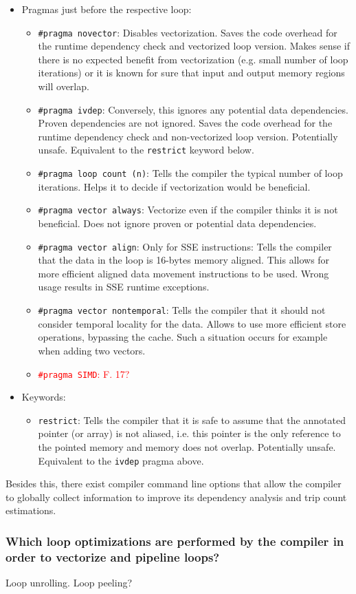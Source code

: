 \documentclass[11pt]{article}
\begin{document}
\begin{itemize}
\item Pragmas just before the respective loop:
\begin{itemize}
\item \texttt{\#pragma novector}: Disables vectorization. Saves the code overhead for the runtime dependency check and vectorized loop version. Makes sense if there is no expected benefit from vectorization (e.g. small number of loop iterations) or it is known for sure that input and output memory regions will overlap.
\item \texttt{\#pragma ivdep}: Conversely, this ignores any potential data dependencies. Proven dependencies are not ignored. Saves the code overhead for the runtime dependency check and non-vectorized loop version. Potentially unsafe. Equivalent to the \texttt{restrict} keyword below.
\item \texttt{\#pragma loop count (n)}: Tells the compiler the typical number of loop iterations. Helps it to decide if vectorization would be beneficial.
\item \texttt{\#pragma vector always}: Vectorize even if the compiler thinks it is not beneficial. Does not ignore proven or potential data dependencies.
\item \texttt{\#pragma vector align}: Only for SSE instructions: Tells the compiler that the data in the loop is 16-bytes memory aligned. This allows for more efficient aligned data movement instructions to be used. Wrong usage results in SSE runtime exceptions.
\item \texttt{\#pragma vector nontemporal}: Tells the compiler that it should not consider temporal locality for the data. Allows to use more efficient store operations, bypassing the cache. Such a situation occurs for example when adding two vectors.
\item \textcolor{red}{\texttt{\#pragma SIMD}: F. 17?}
\end{itemize}
\item Keywords:
\begin{itemize}
\item \texttt{restrict}: Tells the compiler that it is safe to assume that the annotated pointer (or array) is not aliased, i.e. this pointer is the only reference to the pointed memory and memory does not overlap. Potentially unsafe. Equivalent to the \texttt{ivdep} pragma above.
\end{itemize}
\end{itemize}

Besides this, there exist compiler command line options that allow the compiler to globally collect information to improve its dependency analysis and trip count estimations.

\subsubsection*{Which loop optimizations are performed by the compiler in order to vectorize and pipeline loops?}
Loop unrolling.
Loop peeling?
\end{document}
